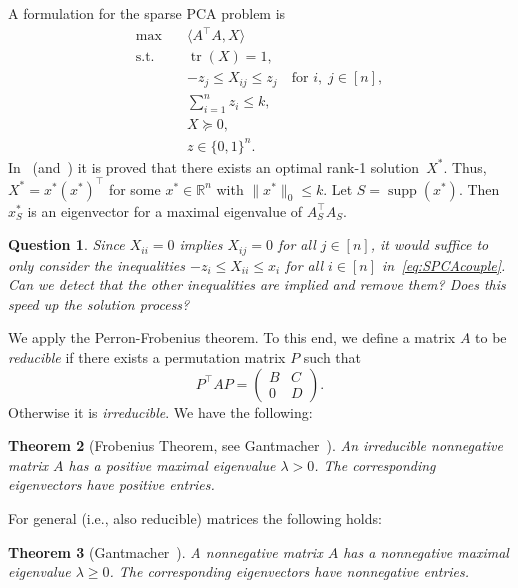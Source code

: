 \documentclass[10pt, a4paper]{article}
\DeclareMathOperator{\supp}{supp}
\DeclareMathOperator{\tr}{tr}
\newcommand{\Norm}[2]{\lVert{#1}\rVert_{#2}}
\newcommand{\skal}[2]{\langle{#1},{#2}\rangle}
\newcommand{\T}{^{\top}}
\newcommand{\R}{\mathds{R}}
\newtheorem{theorem}{Theorem}
\newtheorem{question}[theorem]{Question}
\begin{document}
A formulation for the sparse PCA problem is
\begin{subequations}\label{eq:SPCA}
  \begin{align}
    \max \quad & \skal{A\T A}{X} \\
    \text{s.t.} \quad & \tr(X) = 1, \\
    & -z_j \leq X_{ij} \leq z_j \quad \text{for } i,\; j \in [n],\label{eq:SPCAcouple} \\
    & \sum_{i=1}^n z_i \leq k,\\
    & X \succeq 0, \\
    & z \in \{0,1\}^n.
  \end{align}
\end{subequations}
In~\cite{GalP16} (and~\cite{LiX20}) it is proved that there exists an
optimal rank-1 solution~$X^*$. Thus, $X^* = x^* (x^*)\T$ for some
$x^* \in \R^n$ with $\Norm{x^*}{0} \leq k$. Let $S = \supp(x^*)$. Then
$x^*_S$ is an eigenvector for a maximal eigenvalue of
$A_S\T A_S^{\phantom{T}}$.

\begin{question}
  Since $X_{ii} = 0$ implies $X_{ij} = 0$ for all $j \in [n]$, it would
  suffice to only consider the inequalities $-z_i \leq X_{ii} \leq x_i$ for
  all $i \in [n]$ in~\eqref{eq:SPCAcouple}. Can we detect that the other
  inequalities are implied and remove them? Does this speed up the solution
  process?
\end{question}

We apply the Perron-Frobenius theorem. To this end, we define a matrix $A$ to
be \emph{reducible} if there exists a permutation matrix $P$ such that
\[
  P\T A P = \begin{pmatrix} B & C \\ 0 & D \end{pmatrix}.
\]
Otherwise it is \emph{irreducible}. We have the following:

\begin{theorem}[{Frobenius Theorem, see Gantmacher~\cite[Chapter 2, Thm.~2]{Gan59II}}]\label{thm:PerronFrobenius}
  An irreducible nonnegative matrix $A$ has a positive maximal eigenvalue
  $\lambda > 0$. The corresponding eigenvectors have positive entries.
\end{theorem}

For general (i.e., also reducible) matrices the following holds:
\begin{theorem}[{Gantmacher~\cite[Chapter 2, Thm.~3]{Gan59II}}]\label{thm:PerronFrobeniusNonnegative}
  A nonnegative matrix $A$ has a nonnegative maximal eigenvalue
  $\lambda \geq 0$. The corresponding eigenvectors have nonnegative
  entries.
\end{theorem}
\end{document}
